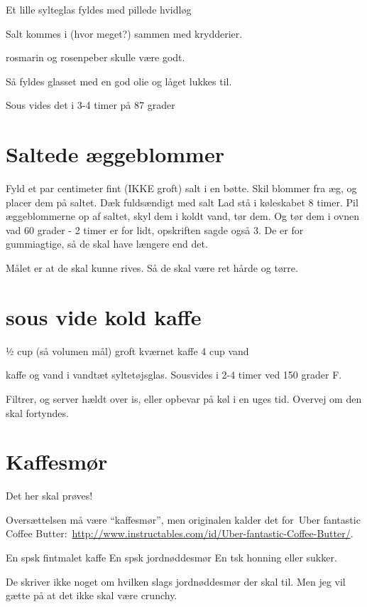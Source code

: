 \documentclass[
]{book}
\begin{document}
Et lille sylteglas fyldes med pillede hvidløg

Salt kommes i (hvor meget?) sammen med krydderier.

rosmarin og rosenpeber skulle være godt.

Så fyldes glasset med en god olie og låget lukkes til.

Sous vides det i 3-4 timer på 87 grader

\section{Saltede æggeblommer}\label{saltede-uxe6ggeblommer}

Fyld et par centimeter fint (IKKE groft) salt i en bøtte.
Skil blommer fra æg, og placer dem på saltet. Dæk fuldsændigt med salt
Lad stå i køleskabet 8 timer.
Pil æggeblommerne op af saltet, skyl dem i koldt vand, tør dem. Og
tør dem i ovnen vad 60 grader - 2 timer er for lidt, opskriften sagde også 3.
De er for gummiagtige, så de skal have længere end det.

Målet er at de skal kunne rives. Så de skal være ret hårde og tørre.

\section{sous vide kold kaffe}\label{sous-vide-kold-kaffe}

½ cup (så volumen mål) groft kværnet kaffe
4 cup vand

kaffe og vand i vandtæt syltetøjsglas. Sousvides i 2-4 timer ved 150 grader F.

Filtrer, og server hældt over is, eller opbevar på køl i en uges tid.
Overvej om den skal fortyndes.

\section{Kaffesmør}\label{kaffesmuxf8r}

Det her skal prøves!~

Oversættelsen må være ``kaffesmør'', men originalen kalder det for~Uber fantastic Coffee Butter:~\url{http://www.instructables.com/id/Uber-fantastic-Coffee-Butter/}.

En spsk fintmalet kaffe
En spsk jordnøddesmør
En tsk honning eller sukker.

De skriver ikke noget om hvilken slags jordnøddesmør der skal til. Men jeg vil gætte på at det ikke skal være crunchy.
\end{document}
